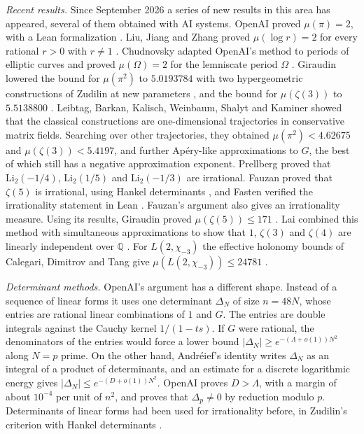 \documentclass[11pt]{amsart}
\theoremstyle{definition}
\theoremstyle{remark}
\numberwithin{equation}{section}
\newcommand{\Q}{\mathbb Q}
\begin{document}
\emph{Recent results.} Since September 2026 a series of new results in this area has appeared, several of
them obtained with AI systems. OpenAI proved $\mu(\pi)=2$, with a Lean formalization \cite{OpenAIPi2026}.
Liu, Jiang and Zhang proved $\mu(\log r)=2$ for every rational $r>0$ with $r\ne1$ \cite{LiuJiangZhang26}.
Chudnovsky adapted OpenAI's method to periods of elliptic curves and proved $\mu(\Omega)=2$ for the lemniscate period
$\Omega$ \cite{Chudnovsky26}.
Giraudin lowered the bound for $\mu(\pi^2)$ to $5.0193784$ with two hypergeometric constructions of Zudilin
\cite{Zudilin14} at new parameters \cite{Giraudin26}, and the bound for $\mu(\zeta(3))$ to $5.5138800$
\cite{Giraudin26z3}. Leibtag, Barkan, Kalisch, Weinbaum, Shalyt and Kaminer \cite{LBKWSK26} showed that the
classical constructions are one-dimensional trajectories in conservative matrix fields. Searching over other
trajectories, they obtained $\mu(\pi^2)<4.62675$ and $\mu(\zeta(3))<5.4197$, and further Ap\'ery-like
approximations to $G$, the best of which still has a negative approximation exponent. Prellberg
\cite{Prellberg26} proved that $\mathrm{Li}_2(-1/4)$, $\mathrm{Li}_2(1/5)$ and $\mathrm{Li}_2(-1/3)$ are
irrational. Fauzan proved that $\zeta(5)$ is irrational, using Hankel determinants \cite{Fauzan2026}, and Fasten verified the
irrationality statement in Lean \cite{Fasten26}. Fauzan's argument also gives an irrationality measure. Using its results,
Giraudin proved $\mu(\zeta(5))\le171$ \cite{Giraudin26z5}. Lai combined this method with simultaneous approximations to show that $1$, $\zeta(3)$ and
$\zeta(4)$ are linearly independent over $\Q$ \cite{Lai2026}. For $L(2,\chi_{-3})$ the effective holonomy
bounds of Calegari, Dimitrov and Tang give $\mu(L(2,\chi_{-3}))\le24781$ \cite[Thm.~5.1]{CDT2025}.

\emph{Determinant methods.} OpenAI's argument \cite{OpenAI2026} has a different shape. Instead of a
sequence of linear forms it uses one determinant $\Delta_N$ of size $n=48N$, whose entries are rational
linear combinations of $1$ and $G$. The entries are double integrals against the Cauchy kernel
$1/(1-ts)$. If $G$ were rational, the denominators of the entries would force a lower bound
$|\Delta_N|\ge e^{-(\Lambda+o(1))N^2}$ along $N=p$ prime. On the other hand, Andr\'eief's identity
\cite{Forrester2018Andreief} writes $\Delta_N$ as an integral of a product of determinants, and an estimate
for a discrete logarithmic energy gives $|\Delta_N|\le e^{-(D+o(1))N^2}$. OpenAI proves $D>\Lambda$, with a
margin of about $10^{-4}$ per unit of $n^2$, and proves that $\Delta_p\ne0$ by reduction modulo $p$.
Determinants of linear forms had been used for irrationality before, in Zudilin's criterion with Hankel
determinants \cite{Zudilin}.
\end{document}
